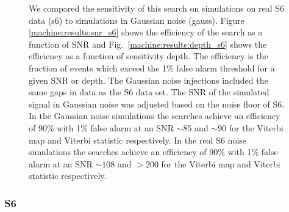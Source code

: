 \begin{figure}
	\caption[Gaussian noise results from SOAP and \gls{CNN} search.]{\label{machine:results:s6gauss} We compared the sensitivity of this
	search on simulations on real S6 data (s6) to simulations in Gaussian noise
	(gauss). Figure \ref{machine:results:snr_s6} shows the efficiency of the search as a function of \gls{SNR} and Fig.~\ref{machine:results:depth_s6} shows the efficiency as a function of sensitivity depth.
	The efficiency is the fraction of events which exceed the 1\% false alarm threshold for a given \gls{SNR} or depth.
	The Gaussian noise injections included the same gaps in data as the S6
	data set. The \gls{SNR} of the simulated signal in Gaussian noise was adjusted
	based on the noise floor of S6. 
	In the Gaussian noise simulations the searches achieve an efficiency of $90\%$ with 1\% false alarm at an \gls{SNR} $\sim 85$ and $\sim 90$ for the Viterbi map and Viterbi statistic respectively.
	In the real S6 noise simulations the searches achieve an efficiency of $90\%$ with 1\% false alarm at an \gls{SNR} $\sim 108$ and $ > 200$ for the Viterbi map and Viterbi statistic respectively.}
	
\end{figure}


\subsubsection{S6}

